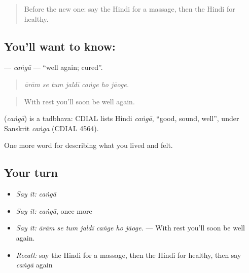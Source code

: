 \label{lesson:HI-C492-canga}



\begin{quote}
Before the new one: say the Hindi for a massage, then the Hindi for healthy.
\end{quote}

\subsection*{You'll want to know: }
\textbf{} — \emph{caṅgā} — \textquotedblleft{}well again; cured\textquotedblright{}.

\begin{quote}
      
\end{quote}

\begin{quote}
\emph{ārām se tum jaldī caṅge ho jāoge.}
\end{quote}

\begin{quote}
With rest you'll soon be well again.
\end{quote}

\begin{cousinweb}
\textbf{} (\emph{caṅgā}) is a tadbhava: CDIAL lists Hindi \emph{caṅgā}, \textquotedblleft{}good, sound, well\textquotedblright{}, under Sanskrit \emph{caṅga} (CDIAL 4564).
\end{cousinweb}

\begin{grammarlens}[title={What you've built}]
One more word for describing what you lived and felt.
\end{grammarlens}

\subsection*{Your turn}
\begin{itemize}
\raggedright
  \item \emph{Say it:} \emph{caṅgā}
  \item \emph{Say it:} \emph{caṅgā}, once more
  \item \emph{Say it:} \emph{ārām se tum jaldī caṅge ho jāoge.} — With rest you'll soon be well again.
  \item \emph{Recall:} say the Hindi for a massage, then the Hindi for healthy, then say \emph{caṅgā} again
\end{itemize}

